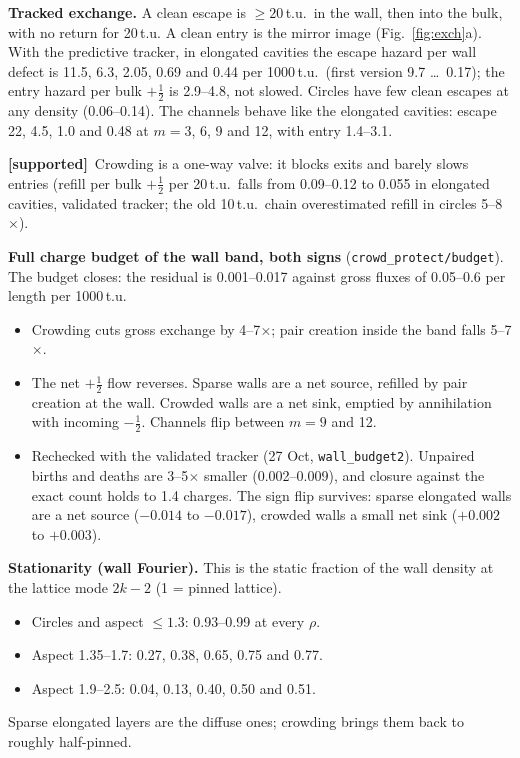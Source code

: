 \documentclass[11pt,a4paper]{article}
\newcommand{\half}{\tfrac12}
\newcommand{\supp}{\textbf{\textcolor{green!50!black}{[supported]}}}
\begin{document}
\textbf{Tracked exchange.} A clean escape is $\geq20$\,t.u.\ in the wall, then into the bulk, with no return for 20\,t.u. A clean entry is the mirror
image (Fig.~\ref{fig:exch}a). With the predictive tracker, in elongated cavities the escape hazard per wall defect is 11.5, 6.3, 2.05, 0.69 and 0.44 per 1000\,t.u.\ (first version 9.7 \dots\ 0.17); the entry
hazard per bulk $+\half$ is 2.9--4.8, not slowed. Circles have few clean escapes at any density (0.06--0.14). The channels behave like the elongated cavities: escape 22, 4.5, 1.0 and 0.48 at $m=3$, 6, 9 and 12, with entry 1.4--3.1.

\supp\ Crowding is a one-way valve: it blocks exits and barely slows entries (refill per bulk $+\half$ per 20\,t.u.\ falls from 0.09--0.12 to 0.055 in elongated cavities, validated tracker; the old 10\,t.u.\ chain overestimated refill in circles 5--8$\times$).

\textbf{Full charge budget of the wall band, both signs} (\texttt{crowd\_protect/budget}). The budget closes: the residual is 0.001--0.017 against gross fluxes of 0.05--0.6 per length per 1000\,t.u.
\begin{itemize}
\item Crowding cuts gross exchange by 4--7$\times$; pair creation inside the band falls 5--7$\times$.
\item The net $+\half$ flow reverses. Sparse walls are a net source, refilled by pair creation at the wall. Crowded walls are a net sink, emptied by annihilation with incoming $-\half$. Channels flip between $m=9$ and 12.
\item Rechecked with the validated tracker (27 Oct, \texttt{wall\_budget2}). Unpaired births and deaths are 3--5$\times$ smaller (0.002--0.009), and closure against the exact count holds to 1.4 charges. The sign flip survives: sparse elongated walls are a net source ($-0.014$ to $-0.017$), crowded walls a small net sink ($+0.002$ to $+0.003$).
\end{itemize}

\textbf{Stationarity (wall Fourier).} This is the static fraction of the wall density at the lattice mode $2k-2$ (1 = pinned lattice).
\begin{itemize}
\item Circles and aspect $\leq1.3$: 0.93--0.99 at every $\rho$.
\item Aspect 1.35--1.7: 0.27, 0.38, 0.65, 0.75 and 0.77.
\item Aspect 1.9--2.5: 0.04, 0.13, 0.40, 0.50 and 0.51.
\end{itemize}
Sparse elongated layers are the diffuse ones; crowding brings them back to roughly half-pinned.
\end{document}
